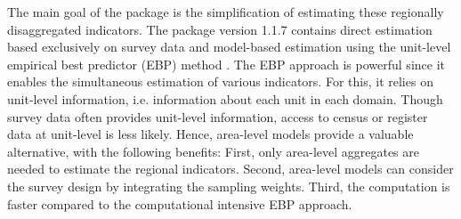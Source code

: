 The main goal of the package  is the simplification of estimating these
regionally disaggregated indicators. The package version 1.1.7 contains direct
estimation based exclusively on survey data and model-based estimation using the
unit-level empirical best predictor (EBP) method \citep{Molina2010}. The EBP
approach is powerful since it enables the simultaneous estimation of various
indicators. For this, it relies on unit-level information, i.e. information
about each unit in each domain. Though survey data often provides unit-level
information, access to census or register data at unit-level is less likely.
Hence, area-level models provide a valuable alternative, with the following
benefits: First, only area-level aggregates are needed to estimate the regional
indicators. Second, area-level models can consider the survey design by integrating the sampling
weights. Third, the computation is faster compared to the computational intensive
EBP approach.


